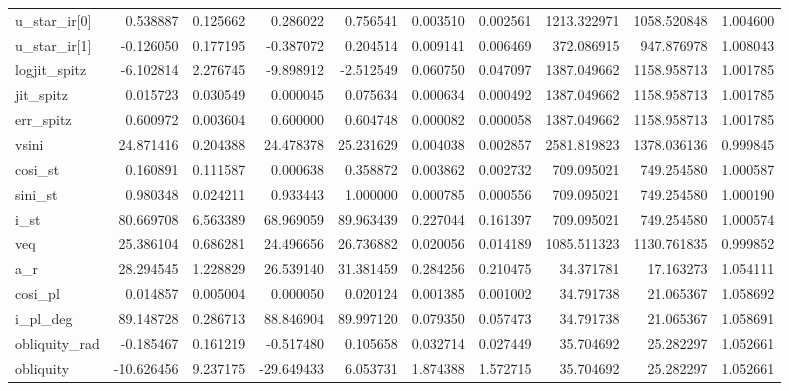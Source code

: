 \begin{tabular}{lrrrrrrrrr}
u\_star\_ir[0]  &     0.538887 &    0.125662 &    0.286022 &     0.756541 &   0.003510 &  0.002561 &  1213.322971 &  1058.520848 &  1.004600 \\
u\_star\_ir[1]  &    -0.126050 &    0.177195 &   -0.387072 &     0.204514 &   0.009141 &  0.006469 &   372.086915 &   947.876978 &  1.008043 \\
logjit\_spitz  &    -6.102814 &    2.276745 &   -9.898912 &    -2.512549 &   0.060750 &  0.047097 &  1387.049662 &  1158.958713 &  1.001785 \\
jit\_spitz     &     0.015723 &    0.030549 &    0.000045 &     0.075634 &   0.000634 &  0.000492 &  1387.049662 &  1158.958713 &  1.001785 \\
err\_spitz     &     0.600972 &    0.003604 &    0.600000 &     0.604748 &   0.000082 &  0.000058 &  1387.049662 &  1158.958713 &  1.001785 \\
vsini         &    24.871416 &    0.204388 &   24.478378 &    25.231629 &   0.004038 &  0.002857 &  2581.819823 &  1378.036136 &  0.999845 \\
cosi\_st       &     0.160891 &    0.111587 &    0.000638 &     0.358872 &   0.003862 &  0.002732 &   709.095021 &   749.254580 &  1.000587 \\
sini\_st       &     0.980348 &    0.024211 &    0.933443 &     1.000000 &   0.000785 &  0.000556 &   709.095021 &   749.254580 &  1.000190 \\
i\_st          &    80.669708 &    6.563389 &   68.969059 &    89.963439 &   0.227044 &  0.161397 &   709.095021 &   749.254580 &  1.000574 \\
veq           &    25.386104 &    0.686281 &   24.496656 &    26.736882 &   0.020056 &  0.014189 &  1085.511323 &  1130.761835 &  0.999852 \\
a\_r           &    28.294545 &    1.228829 &   26.539140 &    31.381459 &   0.284256 &  0.210475 &    34.371781 &    17.163273 &  1.054111 \\
cosi\_pl       &     0.014857 &    0.005004 &    0.000050 &     0.020124 &   0.001385 &  0.001002 &    34.791738 &    21.065367 &  1.058692 \\
i\_pl\_deg      &    89.148728 &    0.286713 &   88.846904 &    89.997120 &   0.079350 &  0.057473 &    34.791738 &    21.065367 &  1.058691 \\
obliquity\_rad &    -0.185467 &    0.161219 &   -0.517480 &     0.105658 &   0.032714 &  0.027449 &    35.704692 &    25.282297 &  1.052661 \\
obliquity     &   -10.626456 &    9.237175 &  -29.649433 &     6.053731 &   1.874388 &  1.572715 &    35.704692 &    25.282297 &  1.052661 \\
\bottomrule
\end{tabular}
